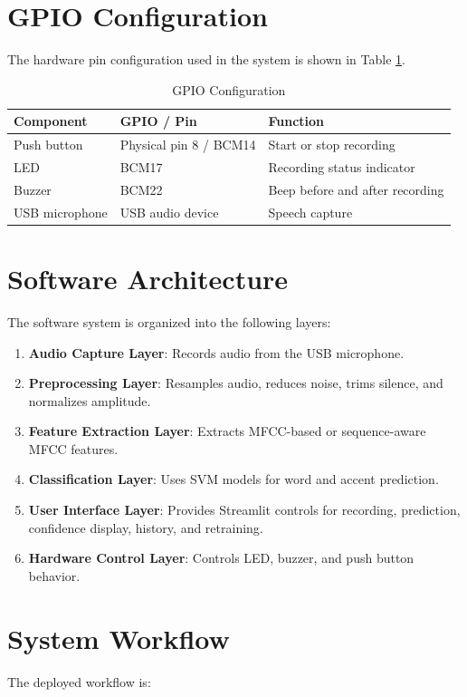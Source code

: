 \documentclass[12pt,a4paper]{report}
\begin{document}
\section{GPIO Configuration}
The hardware pin configuration used in the system is shown in Table \ref{tab:gpio}.

\begin{table}[h]
\centering
\caption{GPIO Configuration}
\label{tab:gpio}
\begin{tabular}{lll}
\toprule
\textbf{Component} & \textbf{GPIO / Pin} & \textbf{Function} \\
\midrule
Push button & Physical pin 8 / BCM14 & Start or stop recording \\
LED & BCM17 & Recording status indicator \\
Buzzer & BCM22 & Beep before and after recording \\
USB microphone & USB audio device & Speech capture \\
\bottomrule
\end{tabular}
\end{table}

\section{Software Architecture}
The software system is organized into the following layers:

\begin{enumerate}
    \item \textbf{Audio Capture Layer}: Records audio from the USB microphone.
    \item \textbf{Preprocessing Layer}: Resamples audio, reduces noise, trims silence, and normalizes amplitude.
    \item \textbf{Feature Extraction Layer}: Extracts MFCC-based or sequence-aware MFCC features.
    \item \textbf{Classification Layer}: Uses SVM models for word and accent prediction.
    \item \textbf{User Interface Layer}: Provides Streamlit controls for recording, prediction, confidence display, history, and retraining.
    \item \textbf{Hardware Control Layer}: Controls LED, buzzer, and push button behavior.
\end{enumerate}

\section{System Workflow}
The deployed workflow is:
\end{document}
